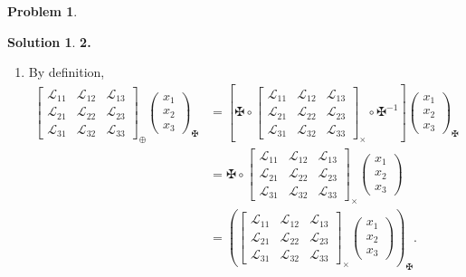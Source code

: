 \documentclass{article}
\theoremstyle{definition}
\newtheorem*{prob*}{Problem}
\newtheorem*{sln*}{Solution}
\newcommand{\lag}{\mathcal{L}}
\begin{document}
\begin{prob*}
	\begin{sln*}\textbf{2.}
		\begin{enumerate}
			\item  By definition,
			\begin{align*}
			\begin{bmatrix}
			\lag_{11} & \lag_{12} & \lag_{13}\\
			\lag_{21} & \lag_{22} & \lag_{23}\\
			\lag_{31} & \lag_{32} & \lag_{33}
			\end{bmatrix}_{\oplus}
			\begin{pmatrix}
			x_1\\x_2\\x_3
			\end{pmatrix}_{\maltese} 
			&=
			\left[\maltese
			\circ
			\begin{bmatrix}
			\lag_{11} & \lag_{12} & \lag_{13}\\
			\lag_{21} & \lag_{22} & \lag_{23}\\
			\lag_{31} & \lag_{32} & \lag_{33}
			\end{bmatrix}_\times 
			\circ 
			\maltese^{-1}\right]\begin{pmatrix}
			x_1\\x_2\\x_3
			\end{pmatrix}_{\maltese} \\
			&= \maltese
			\circ
			\begin{bmatrix}
			\lag_{11} & \lag_{12} & \lag_{13}\\
			\lag_{21} & \lag_{22} & \lag_{23}\\
			\lag_{31} & \lag_{32} & \lag_{33}
			\end{bmatrix}_\times \begin{pmatrix}
			x_1\\x_2\\x_3
			\end{pmatrix}\\
			&= 
			\left( \begin{bmatrix}
			\lag_{11} & \lag_{12} & \lag_{13}\\
			\lag_{21} & \lag_{22} & \lag_{23}\\
			\lag_{31} & \lag_{32} & \lag_{33}
			\end{bmatrix}_\times \begin{pmatrix}
			x_1\\x_2\\x_3
			\end{pmatrix}   \right)_{\maltese}.
			\end{align*}
						

\end{enumerate}
\end{sln*}
\end{prob*}
\end{document}
